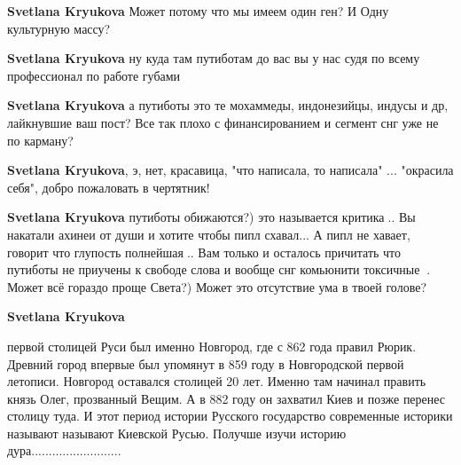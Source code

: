 \begin{itemize}
\begin{itemize}
\textbf{Svetlana Kryukova} Может потому что мы имеем один ген? И Одну культурную массу?

 
\textbf{Svetlana Kryukova} ну куда там путиботам до вас вы у нас судя по всему профессионал по работе губами

 
\textbf{Svetlana Kryukova} а путиботы это те мохаммеды, индонезийцы, индусы и др, лайкнувшие ваш пост? Все так плохо с финансированием и сегмент снг уже не по карману?

 
\textbf{Svetlana Kryukova}, э, нет, красавица, "что написала, то написала" ...
"окрасила себя", добро пожаловать в чертятник!

 
\textbf{Svetlana Kryukova} путиботы обижаются?) это называется критика🤣.. Вы накатали ахинеи от души и хотите чтобы пипл схавал... А пипл не хавает, говорит что глупость полнейшая🤣.. Вам только и осталось причитать что путиботы не приучены к свободе слова и вообще снг комьюнити токсичные🤣🤣. Может всё гораздо проще Света?) Может это отсутствие ума в твоей голове?

 
\textbf{Svetlana Kryukova} 

первой столицей Руси был именно Новгород, где с 862 года правил Рюрик. Древний
город впервые был упомянут в 859 году в Новгородской первой летописи. Новгород
оставался столицей 20 лет. Именно там начинал править князь Олег, прозванный
Вещим. А в 882 году он захватил Киев и позже перенес столицу туда. И этот
период истории Русского государство современные историки называют называют
Киевской Русью. Получше изучи историю дура..........................


\end{itemize}
\end{itemize}
